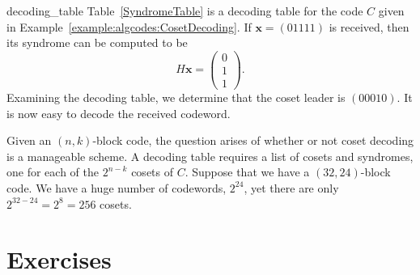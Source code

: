  
\begin{example}{decoding_table}
Table~\ref{SyndromeTable} is a decoding table for the code $C$ given in Example~\ref{example:algcodes:CosetDecoding}. 
If ${\mathbf x} = (01111)$ is received, then its syndrome can be computed to be
\[
H {\mathbf x} =
\begin{pmatrix}
0 \\ 1 \\ 1
\end{pmatrix}.
\]
Examining the decoding table, we determine that the coset leader is
$(00010)$. It is now easy to decode the received codeword. 
\end{example}
 
 
Given an $(n,k)$-block code, the question arises of whether or not
coset decoding is a manageable scheme.  A decoding table requires a
list of cosets and syndromes, one for each of the $2^{n-k}$ cosets of
$C$.  Suppose that we have a $(32, 24)$-block code.  We have a huge
number of codewords, $2^{24}$, yet there are only $2^{32-24} = 2^{8} =
256$ cosets.  
 

 
 
 
 
\section*{Exercises}
\exrule
 
 
 
